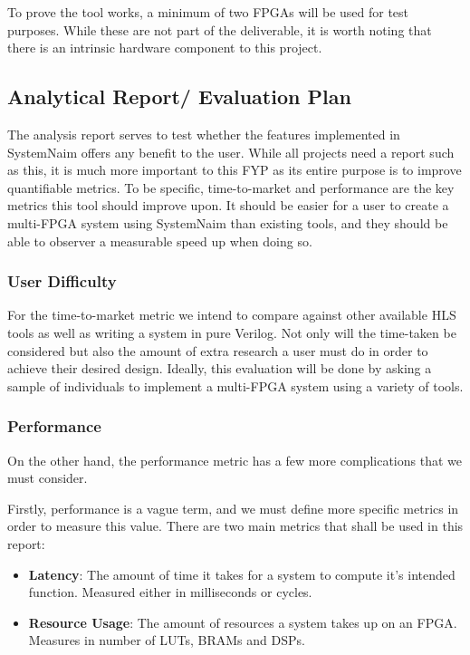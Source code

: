 To prove the tool works, a minimum of two FPGAs will be used for test purposes. While these are not part of the deliverable, it is worth noting that there is an intrinsic hardware component to this project.


\subsection{Analytical Report/ Evaluation Plan}

The analysis report serves to test whether the features implemented in SystemNaim offers any benefit to the user. While all projects need a report such as this, it is much more important to this FYP as its entire purpose is to improve quantifiable metrics. To be specific, time-to-market and performance are the key metrics this tool should improve upon. It should be easier for a user to create a multi-FPGA system using SystemNaim than existing tools, and they should be able to observer a measurable speed up when doing so.

\subsubsection{User Difficulty}
For the time-to-market metric we intend to compare against other available HLS tools as well as writing a system in pure Verilog. Not only will the time-taken be considered but also the amount of extra research a user must do in order to achieve their desired design. Ideally, this evaluation will be done by asking a sample of individuals to implement a multi-FPGA system using a variety of tools.

\subsubsection{Performance}
On the other hand, the performance metric has a few more complications that we must consider. 

Firstly, performance is a vague term, and we must define more specific metrics in order to measure this value. There are two main metrics that shall be used in this report: 

\begin{itemize}
    \item \textbf{Latency}: The amount of time it takes for a system to compute it's intended function. Measured either in milliseconds or cycles.
    \item \textbf{Resource Usage}: The amount of resources a system takes up on an FPGA. Measures in number of LUTs, BRAMs and DSPs.
\end{itemize}

